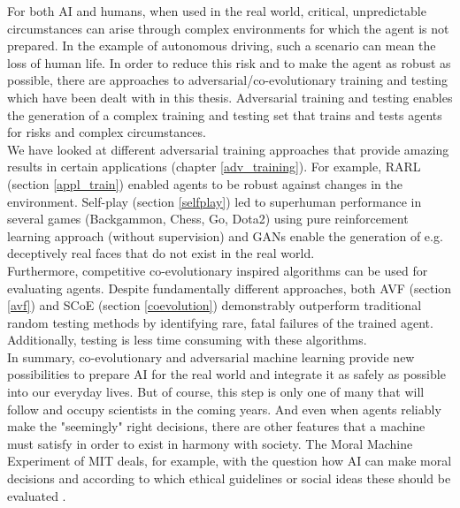 For both AI and humans, when used in the real world, critical, unpredictable circumstances can arise through complex environments for which the agent is not prepared. In the example of autonomous driving, such a scenario can mean the loss of human life. In order to reduce this risk and to make the agent as robust as possible, there are approaches to adversarial/co-evolutionary training and testing which have been dealt with in this thesis. Adversarial training and testing enables the generation of a complex training and testing set that trains and tests agents for risks and complex circumstances.\\
We have looked at different adversarial training approaches that provide amazing results in certain applications (chapter \ref{adv_training}). For example, RARL (section \ref{appl_train}) enabled agents to be robust against changes in the environment. Self-play (section \ref{selfplay}) led to superhuman performance in several games (Backgammon, Chess, Go, Dota2) using pure reinforcement learning approach (without supervision) and GANs enable the generation of e.g. deceptively real faces that do not exist in the real world.\\
Furthermore, competitive co-evolutionary inspired algorithms can be used for evaluating agents. Despite fundamentally different approaches, both AVF (section \ref{avf}) and SCoE (section \ref{coevolution}) demonstrably outperform traditional random testing methods by identifying rare, fatal failures of the trained agent. Additionally, testing is less time consuming with these algorithms.\\
In summary, co-evolutionary and adversarial machine learning provide new possibilities to prepare AI for the real world and integrate it as safely as possible into our everyday lives. But of course, this step is only one of many that will follow and occupy scientists in the coming years. And even when agents reliably make the "seemingly" right decisions, there are other features that a machine must satisfy in order to exist in harmony with society. The Moral Machine Experiment of MIT deals, for example, with the question how AI can make moral decisions and according to which ethical guidelines or social ideas these should be evaluated \cite{awad2018moral}.